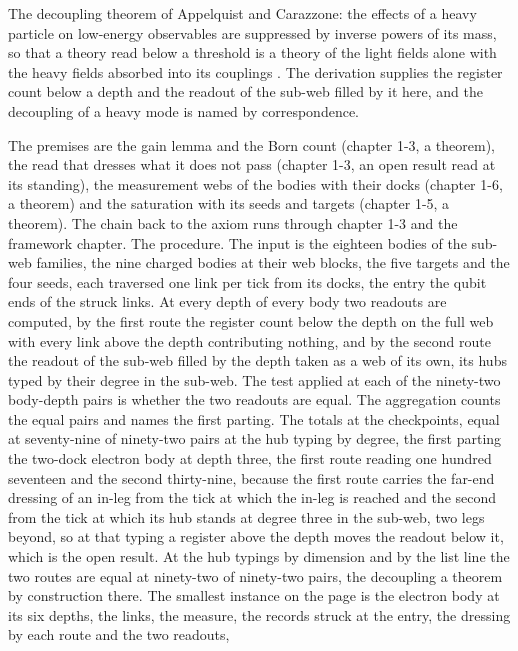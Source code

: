 \begin{chbridge}
The decoupling theorem of Appelquist and Carazzone: the effects of a heavy particle on low-energy observables are suppressed by inverse powers of its mass, so that a theory read below a threshold is a theory of the light fields alone with the heavy fields absorbed into its couplings \cite{AppelquistCarazzone1975}. The derivation supplies the register count below a depth and the readout of the sub-web filled by it here, and the decoupling of a heavy mode is named by correspondence.
\end{chbridge}
\begin{chproof}[finite]
The premises are the gain lemma and the Born count (chapter 1-3, a theorem), the read that dresses what it does not pass (chapter 1-3, an open result read at its standing), the measurement webs of the bodies with their docks (chapter 1-6, a theorem) and the saturation with its seeds and targets (chapter 1-5, a theorem). The chain back to the axiom runs through chapter 1-3 and the framework chapter. The procedure. The input is the eighteen bodies of the sub-web families, the nine charged bodies at their web blocks, the five targets and the four seeds, each traversed one link per tick from its docks, the entry the qubit ends of the struck links. At every depth of every body two readouts are computed, by the first route the register count below the depth on the full web with every link above the depth contributing nothing, and by the second route the readout of the sub-web filled by the depth taken as a web of its own, its hubs typed by their degree in the sub-web. The test applied at each of the ninety-two body-depth pairs is whether the two readouts are equal. The aggregation counts the equal pairs and names the first parting. The totals at the checkpoints, equal at seventy-nine of ninety-two pairs at the hub typing by degree, the first parting the two-dock electron body at depth three, the first route reading one hundred seventeen and the second thirty-nine, because the first route carries the far-end dressing of an in-leg from the tick at which the in-leg is reached and the second from the tick at which its hub stands at degree three in the sub-web, two legs beyond, so at that typing a register above the depth moves the readout below it, which is the open result. At the hub typings by dimension and by the list line the two routes are equal at ninety-two of ninety-two pairs, the decoupling a theorem by construction there. The smallest instance on the page is the electron body at its six depths, the links, the measure, the records struck at the entry, the dressing by each route and the two readouts,

\end{chproof}
